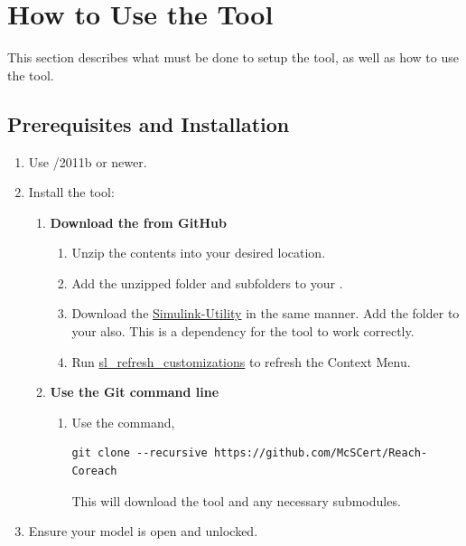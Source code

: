 \documentclass{article}
\begin{document}
\section{How to Use the Tool}
This section describes what must be done to setup the tool, as well as how to use the tool.

\subsection{Prerequisites and Installation}

\begin{enumerate}
	\item Use \Matlab/\Simulink 2011b or newer.
	\item Install the tool:
	\begin{enumerate}
		\item \textbf{Download the  from GitHub}
		
		\begin{enumerate} 
			\item Unzip the contents into your desired location. 
			\item Add the unzipped folder and subfolders to your \mpath. 
			\item Download the \href{https://github.com/McSCert/Simulink-Utility}{Simulink-Utility} in the same manner. Add the folder to your \mpath also. This is a dependency for the tool to work correctly.
			\item Run \href{https://www.mathworks.com/help/simulink/ug/registering-customizations.html}{sl\_refresh\_customizations} to refresh the Context Menu. 
		\end{enumerate}
		\item \textbf{Use the Git command line}
			\begin{enumerate}
				\item Use the command, \begin{verbatim}git clone --recursive https://github.com/McSCert/Reach-Coreach\end{verbatim} This will download the tool and any necessary submodules.
			\end{enumerate}
	\end{enumerate}
	\item Ensure your model is open and unlocked.
\end{enumerate}
\end{document}
